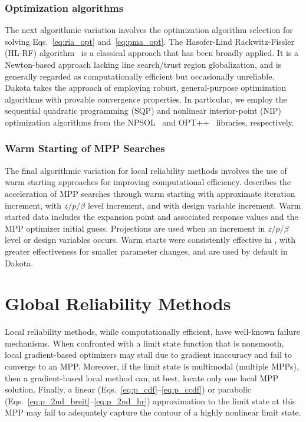\subsubsection{Optimization algorithms}

The next algorithmic variation involves the optimization algorithm
selection for solving Eqs.~\ref{eq:ria_opt} and~\ref{eq:pma_opt}.  The
Hasofer-Lind Rackwitz-Fissler (HL-RF) algorithm~\cite{Hal00} is a
classical approach that has been broadly applied.  It is a
Newton-based approach lacking line search/trust region globalization,
and is generally regarded as computationally efficient but
occasionally unreliable.  Dakota takes the approach of employing
robust, general-purpose optimization algorithms with provable
convergence properties.  In particular, we employ the sequential
quadratic programming (SQP) and nonlinear interior-point (NIP)
optimization algorithms from the NPSOL~\cite{Gil86} and
OPT++~\cite{MeOlHoWi07} libraries, respectively.


\subsubsection{Warm Starting of MPP Searches}  

The final algorithmic variation for local reliability methods involves
the use of warm starting approaches for improving computational
efficiency.  \cite{Eld05} describes the acceleration of MPP
searches through warm starting with approximate iteration increment,
with $z/p/\beta$ level increment, and with design variable increment.
Warm started data includes the expansion point and associated response
values and the MPP optimizer initial guess.  Projections are used when
an increment in $z/p/\beta$ level or design variables occurs.  Warm
starts were consistently effective in \cite{Eld05}, with greater
effectiveness for smaller parameter changes, and are used by default
in Dakota. %


\section{Global Reliability Methods}\label{uq:reliability:global}

Local reliability methods, while computationally efficient, have
well-known failure mechanisms.  When confronted with a limit state
function that is nonsmooth, local gradient-based optimizers may stall
due to gradient inaccuracy and fail to converge to an MPP.  Moreover,
if the limit state is multimodal (multiple MPPs), then a
gradient-based local method can, at best, locate only one local MPP
solution.  Finally, a linear (Eqs.~\ref{eq:p_cdf}--\ref{eq:p_ccdf}) or
parabolic (Eqs.~\ref{eq:p_2nd_breit}--\ref{eq:p_2nd_hr}) approximation
to the limit state at this MPP may fail to adequately capture the
contour of a highly nonlinear limit state.  %

